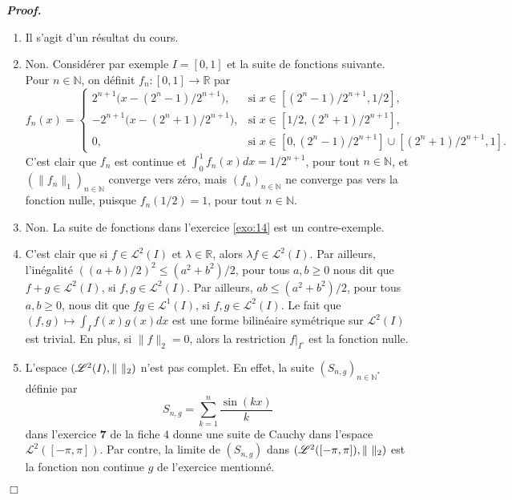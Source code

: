 \documentclass[11pt,a4paper]{article}
\newcommand{\NN}{\mathbb{N}}
\newcommand{\RR}{\mathbb{R}}
\newenvironment{preuve}[1][]
{\vskip 2mm  \noindent\emph{\bf Proof#1. }}{$\Box$ \vskip 2mm}
\let\geq\geqslant
\let\leq\leqslant
\newcounter{exercice}
\begin{document}
	\begin{preuve}
		\begin{enumerate}
			\item Il s'agit d'un résultat du cours. 
			
			\item Non. 
			Considérer par exemple $I = [0,1]$ et la suite de fonctions suivante. 
			Pour $n \in \NN$, on définit $f_{n} : [0,1] \rightarrow \RR$ par 
			\[     f_{n}(x) = \begin{cases} 
			2^{n+1}\big(x-(2^{n}-1)/2^{n+1}\big), &\text{si $x \in [(2^{n}-1)/2^{n+1}, 1/2]$},
			\\
			-2^{n+1}\big(x-(2^{n}+1)/2^{n+1}\big), &\text{si $x \in [1/2, (2^{n}+1)/2^{n+1}]$},
			\\
			0, &\text{si $x \in [0,(2^{n}-1)/2^{n+1}] \cup [(2^{n}+1)/2^{n+1}, 1]$}.
			\end{cases}
			\]
			C'est clair que $f_{n}$ est continue et $\int_0^1 f_n(x) dx = 1/2^{n+1}$, pour tout $n \in \NN$, et $(\| f_n \|_{1})_{n \in \NN}$
			converge vers zéro, mais $(f_n)_{n \in \NN}$ ne converge pas vers la fonction nulle, puisque $f_{n}(1/2) = 1$, pour tout $n \in \NN$. 
			
			\item Non. 
			La suite de fonctions dans l'exercice \ref{exo:14} est un contre-exemple. 
			
			\item C'est clair que si $f \in \mathscr{L}^2(I)$ et $\lambda \in \RR$, alors $\lambda f \in \mathscr{L}^2(I)$. 
			Par ailleurs, l'inégalité $((a+b)/2)^{2} \leq (a^{2} + b^{2})/2$, pour tous $a,b \geq 0$ nous dit que $f+g \in \mathscr{L}^2(I)$, si 
			$f, g \in \mathscr{L}^2(I)$. 
			Par ailleurs, $ab \leq (a^{2} + b^{2})/2$, pour tous $a,b \geq 0$, nous dit que $fg \in \mathscr{L}^{1}(I)$, si 
			$f, g \in \mathscr{L}^2(I)$. 
			Le fait que $(f,g) \mapsto \int_I f(x)g(x)dx$ est une forme bilinéaire symétrique sur $\mathscr{L}^2(I)$ est trivial. 
			En plus, si $\| f \|_{2} = 0$, alors la restriction $f|_{I^{\circ}}$ est la fonction nulle. 
			
			\item L'espace $(\mathscr{L}^2(I),\| \hskip 1.2mm \|_2)$ n'est pas complet. 
			En effet, la suite $(S_{n,g})_{n \in \NN^{*}}$ définie par
			\[     S_{n,g} = \sum_{k=1}^{n} \frac{\sin(kx)}{k}     \]
			dans l'exercice \textbf{7} de la fiche $4$ donne une suite de Cauchy dans l'espace $\mathscr{L}^2([-\pi,\pi])$. 
			Par contre, la limite de  $(S_{n,g})$ dans $(\mathscr{L}^2([-\pi,\pi]),\| \hskip 1.2mm \|_2)$ est la fonction non continue 
			$g$ de l'exercice mentionné. 
			

\end{enumerate}
\end{preuve}
\end{document}
